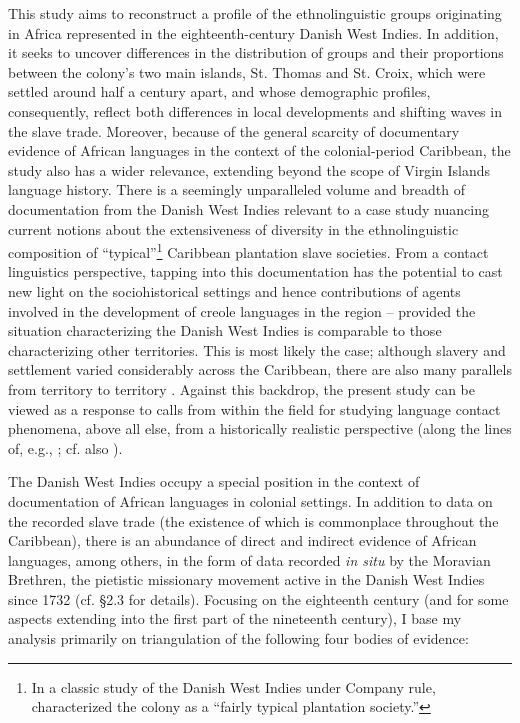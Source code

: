 \documentclass[output=paper,colorlinks,citecolor=brown]{langscibook}
\begin{document}
This study aims to reconstruct a profile of the ethnolinguistic groups originating in Africa represented in the eighteenth-century Danish West Indies. In addition, it seeks to uncover differences in the distribution of groups and their proportions between the colony’s two main islands, St. Thomas and St. Croix, which were settled around half a century apart, and whose demographic profiles, consequently, reflect both differences in local developments and shifting waves in the slave trade. Moreover, because of the general scarcity of documentary evidence of African languages in the context of the colonial-period Caribbean, the study also has a wider relevance, extending beyond the scope of Virgin Islands language history. There is a seemingly unparalleled volume and breadth of documentation from the Danish West Indies relevant to a case study nuancing current notions about the extensiveness of diversity in the ethnolinguistic composition of “typical”\footnote{In a classic study of the Danish West Indies under Company rule, \citet[121]{Westergaard_1917} characterized the colony as a “fairly typical plantation society.”} Caribbean plantation slave societies. From a contact linguistics perspective, tapping into this documentation has the potential to cast new light on the sociohistorical settings and hence contributions of agents involved in the development of creole languages in the region – provided the situation characterizing the Danish West Indies is comparable to those characterizing other territories. This is most likely the case; although slavery and settlement varied considerably across the Caribbean, there are also many parallels from territory to territory \citep[see, e.g.,][]{Higman_2011}. Against this backdrop, the present study can be viewed as a response to calls from within the field for studying language contact phenomena, above all else, from a historically realistic perspective (along the lines of, e.g., \cite{Arends_2008}; cf. also \cite{Kouwenberg_Singler_2018}).

The Danish West Indies occupy a special position in the context of documentation of African languages in colonial settings. In addition to data on the recorded slave trade (the existence of which is commonplace throughout the Caribbean), there is an abundance of direct and indirect evidence of African languages, among others, in the form of data recorded \emph{in situ} by the Moravian Brethren, the pietistic missionary movement active in the Danish West Indies since 1732 (cf. §2.3 for details). Focusing on the eighteenth century (and for some aspects extending into the first part of the nineteenth century), I base my analysis primarily on triangulation of the following four bodies of evidence:
\end{document}
